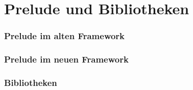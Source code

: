 \section{Prelude und Bibliotheken}

\begin{frame}
\frametitle{Prelude im alten Framework}

\begin{figure}
\end{figure}
\end{frame}

\begin{frame}
\frametitle{Prelude im neuen Framework}

\begin{figure}
\end{figure}
\end{frame}

\begin{frame}
\frametitle{Bibliotheken}

\begin{figure}
\end{figure}
\end{frame}